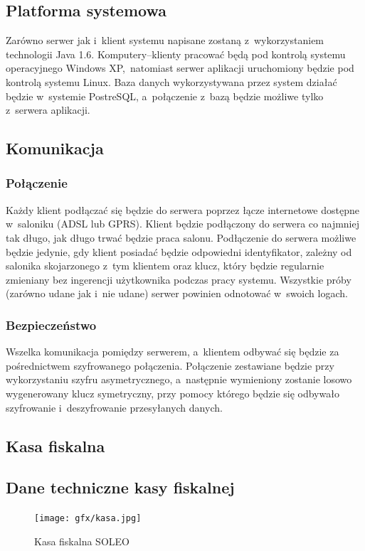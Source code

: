 \subsection{Platforma systemowa}
Zarówno serwer jak i~klient systemu napisane zostaną z~wykorzystaniem technologii Java 1.6. Komputery--klienty pracować będą pod kontrolą systemu operacyjnego Windows XP\texttrademark ,~natomiast serwer aplikacji uruchomiony będzie pod kontrolą systemu Linux. Baza danych wykorzystywana przez system działać będzie w~systemie PostreSQL, a~połączenie z~bazą będzie możliwe tylko z~serwera aplikacji.
\subsection{Komunikacja}
\subsubsection{Połączenie}
Każdy klient podłączać się będzie do serwera poprzez łącze internetowe dostępne w~saloniku (ADSL lub GPRS). Klient będzie podłączony do serwera co najmniej tak długo, jak długo trwać będzie praca salonu. Podłączenie do serwera możliwe będzie jedynie, gdy klient posiadać będzie odpowiedni identyfikator, zależny od salonika skojarzonego z~tym klientem oraz klucz, który będzie regularnie zmieniany bez ingerencji użytkownika podczas pracy systemu. Wszystkie próby (zarówno udane jak i~nie udane) serwer powinien odnotować w~swoich logach.
\subsubsection{Bezpieczeństwo}
Wszelka komunikacja pomiędzy serwerem, a~klientem odbywać się będzie za pośrednictwem szyfrowanego połączenia. Połączenie zestawiane będzie przy wykorzystaniu szyfru asymetrycznego, a~następnie wymieniony zostanie losowo wygenerowany klucz symetryczny, przy pomocy którego będzie się odbywało szyfrowanie i~deszyfrowanie przesyłanych danych.
\subsection{Kasa fiskalna}

\subsection{Dane techniczne kasy fiskalnej}
\begin{figure}
\texttt{[image: gfx/kasa.jpg]}
\caption{Kasa fiskalna SOLEO}
\end{figure}
